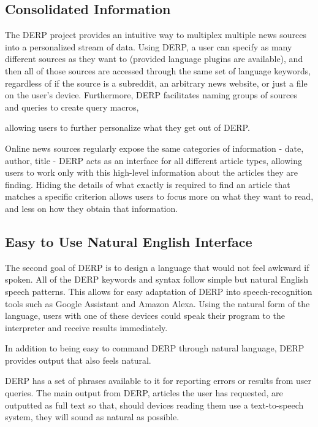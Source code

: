 \documentclass{article}
\begin{document}
\subsection{Consolidated Information}
The DERP project provides an intuitive way to multiplex multiple news sources into a personalized stream of data. Using DERP, a user can specify as many different sources as they want to (provided language plugins are available), and then all of those sources are accessed through the same set of language keywords, regardless of if the source is a subreddit, an arbitrary news website, or just a file on the user's device. Furthermore, DERP facilitates naming groups of sources and queries to create query macros,
\begin{comment}
@ADS Did we actually decide on if we want savable sets of instructions other than in the form of a DERP program? (Can a program create another program?)
\end{comment}
allowing users to further personalize what they get out of DERP.

Online news sources regularly expose the same categories of information - date, author, title - DERP acts as an interface for all different article types, allowing users to work only with this high-level information about the articles they are finding. Hiding the details of what exactly is required to find an article that matches a specific criterion allows users to focus more on what they want to read, and less on how they obtain that information.

\subsection{Easy to Use Natural English Interface}
The second goal of DERP is to design a language that would not feel awkward if spoken. All of the DERP keywords and syntax follow simple but natural English speech patterns. This allows for easy adaptation of DERP into speech-recognition tools such as Google Assistant and Amazon Alexa. Using the natural form of the language, users with one of these devices could speak their program to the interpreter and receive results immediately.

In addition to being easy to command DERP through natural language, DERP provides output that also feels natural.
\begin{comment}
@ADS - Is this something we're actually doing? We've kind of had it implied
in discussions, but never explicitly talked about it
\end{comment}
DERP has a set of phrases available to it for reporting errors or results from user queries. The main output from DERP, articles the user has requested, are outputted as full text so that, should devices reading them use a text-to-speech system, they will sound as natural as possible.
\end{document}
